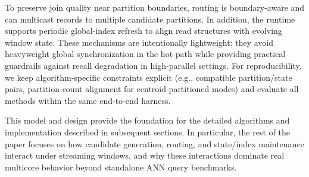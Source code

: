 To preserve join quality near partition boundaries, routing is boundary-aware and can multicast records to multiple candidate partitions. In addition, the runtime supports periodic global-index refresh to align read structures with evolving window state. These mechanisms are intentionally lightweight: they avoid heavyweight global synchronization in the hot path while providing practical guardrails against recall degradation in high-parallel settings. For reproducibility, we keep algorithm-specific constraints explicit (e.g., compatible partition/state pairs, partition-count alignment for centroid-partitioned modes) and evaluate all methods within the same end-to-end harness.

This model and design provide the foundation for the detailed algorithms and implementation described in subsequent sections. In particular, the rest of the paper focuses on how candidate generation, routing, and state/index maintenance interact under streaming windows, and why these interactions dominate real multicore behavior beyond standalone ANN query benchmarks.
